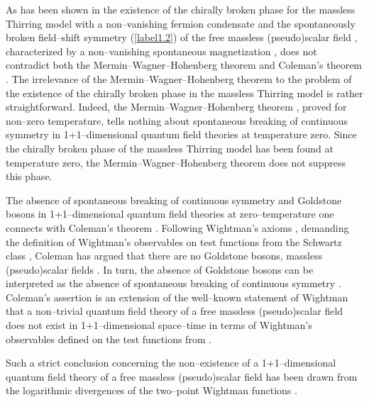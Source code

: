 \documentclass[a4paper,12pt] {article}
\begin{document}
As has been shown in\cite{th0112184,th0204237,th0206244} the existence
of the chirally broken phase for the massless Thirring model with a
non--vanishing fermion condensate \cite{th0105057} and the
spontaneously broken field--shift symmetry (\ref{label1.2}) of the
free massless (pseudo)scalar field \coordHE{}, characterized by a
non--vanishing spontaneous magnetization
\cite{th0112184,th0204237,th0206244}, does not contradict both the
Mermin--Wagner--Hohenberg theorem \cite{MWH66} and Coleman's theorem
\cite{Co73}.  The irrelevance of the Mermin--Wagner--Hohenberg theorem
\cite{MWH66} to the problem of the existence of the chirally broken
phase in the massless Thirring model is rather straightforward.
Indeed, the Mermin--Wagner--Hohenberg theorem \cite{MWH66}, proved for
non--zero temperature, tells nothing about spontaneous breaking of
continuous symmetry in 1+1--dimensional quantum field theories at
temperature zero\cite{th0112184,th0204237,th0206244}. Since the
chirally broken phase of the massless Thirring model \cite{th0105057}
has been found at temperature zero, the Mermin--Wagner--Hohenberg
theorem \cite{MWH66} does not suppress this phase.

The absence of spontaneous breaking of continuous symmetry and
Goldstone bosons in 1+1--dimensional quantum field theories at
zero--temperature one connects with Coleman's theorem \cite{Co73}.
Following Wightman's axioms \cite{Wi64}, demanding the definition of
Wightman's observables on test functions from the Schwartz class
\coordHE{}, Coleman has argued that there are no
Goldstone bosons, massless (pseudo)scalar fields \cite{Co73}. In turn,
the absence of Goldstone bosons \cite{Go61} can be interpreted as the
absence of spontaneous breaking of continuous symmetry \cite{Co75}.
Coleman's assertion is an extension of the well--known statement of
Wightman \cite{Wi64} that a non--trivial quantum field theory of a
free massless (pseudo)scalar field does not exist in 1+1--dimensional
space--time in terms of Wightman's observables defined on the test
functions from \coordHE{}.

Such a strict conclusion concerning the non--existence of a
1+1--dimensional quantum field theory of a free massless
(pseudo)scalar field \coordHE{} has been drawn from the
logarithmic divergences of the two--point Wightman functions
\cite{Wi64}.
\end{document}
